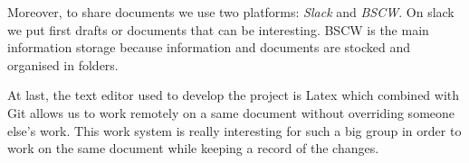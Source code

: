 Moreover, to share documents we use two platforms: \textit{Slack} and \textit{BSCW}. On slack we put first drafts or documents that can be interesting. BSCW is the main information storage because information and documents are stocked and organised in folders. 
\newline

At last, the text editor used to develop the project is Latex which combined with Git allows us to work remotely on a same document without overriding someone else's work. This work system is really interesting for such a big group in order to work on the same document while keeping a record of the changes.